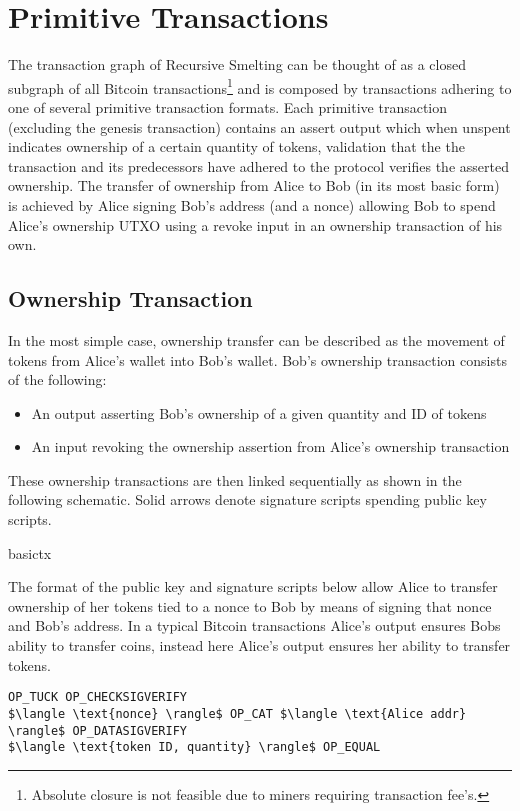 \documentclass[9pt,oneside]{amsart}
\begin{document}
\section{Primitive Transactions}\label{sec:primtrans}
The transaction graph of Recursive Smelting can be thought of as a closed subgraph of all Bitcoin transactions\footnote{Absolute closure is not feasible due to miners requiring transaction fee's.} and is composed by transactions adhering to one of several primitive transaction formats. Each primitive transaction (excluding the genesis transaction) contains an assert output which when unspent indicates ownership of a certain quantity of tokens, validation that the the transaction and its predecessors have adhered to the protocol verifies the asserted ownership. The transfer of ownership from Alice to Bob (in its most basic form) is achieved by Alice signing Bob's address (and a nonce) allowing Bob to spend Alice's ownership UTXO using a revoke input in an ownership transaction of his own.

\subsection{Ownership Transaction}\label{subsec:basicownershiptx}
In the most simple case, ownership transfer can be described as the movement of tokens from Alice's wallet into Bob's wallet. Bob's ownership transaction consists of the following:
\begin{itemize}
    \item An output asserting Bob's ownership of a given quantity and ID of tokens
    \item An input revoking the ownership assertion from Alice's ownership transaction
\end{itemize}

These ownership transactions are then linked sequentially as shown in the following schematic. Solid arrows denote signature scripts spending public key scripts.
\begin{center}
{basictx}
\end{center}

The format of the public key and signature scripts below allow Alice to transfer ownership of her tokens tied to a nonce to Bob by means of signing that nonce and Bob's address. In a typical Bitcoin transactions Alice's output ensures Bobs ability to transfer coins, instead here Alice's output ensures her ability to transfer tokens.

\begin{lstlisting}[title={\textbf{Alice's Assert PubKey Script}}]
OP_TUCK OP_CHECKSIGVERIFY
$\langle \text{nonce} \rangle$ OP_CAT $\langle \text{Alice addr} \rangle$ OP_DATASIGVERIFY
$\langle \text{token ID, quantity} \rangle$ OP_EQUAL
\end{lstlisting}
\end{document}
